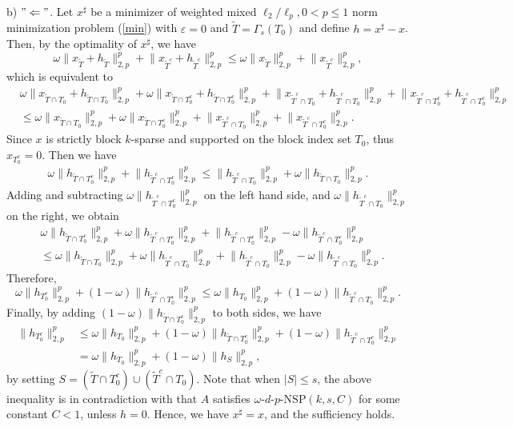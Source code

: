\documentclass[11pt]{article}
\begin{document}
b) $"\Leftarrow"$. Let $x^{\sharp}$ be a minimizer of  weighted mixed $\ell_2/\ell_p, 0<p\leq 1$ norm minimization problem (\ref{min}) with $\varepsilon=0$ and $\tilde{T}=\Gamma_s(T_0)$ and define $h=x^{\sharp}-x$. Then, by the optimality of $x^{\sharp}$, we have $$
\omega\lVert x_{\tilde{T}}+h_{\tilde{T}}\rVert_{2,p}^p+\lVert x_{\tilde{T}^c}+h_{\tilde{T}^c}\rVert_{2,p}^p\leq \omega\lVert x_{\tilde{T}}\rVert_{2,p}^p+
\lVert x_{\tilde{T}^c}\rVert_{2,p}^p,
$$
which is equivalent to \begin{align*}
&\omega\lVert x_{\tilde{T}\cap T_0}+h_{\tilde{T}\cap T_0}\rVert_{2,p}^p+\omega\lVert x_{\tilde{T}\cap T_0^c}+h_{\tilde{T}\cap T_0^c}\rVert_{2,p}^p+\lVert x_{\tilde{T}^c\cap T_0}+h_{\tilde{T}^c\cap T_0}\rVert_{2,p}^p+\lVert x_{\tilde{T}^c\cap T_0^c}+h_{\tilde{T}^c\cap T_0^c}\rVert_{2,p}^p \\
&\leq \omega\lVert x_{\tilde{T}\cap T_0}\rVert_{2,p}^p+ \omega\lVert x_{\tilde{T}\cap T_0^c}\rVert_{2,p}^p+\lVert x_{\tilde{T}^c\cap T_0}\rVert_{2,p}^p+\lVert x_{\tilde{T}^c\cap T_0^c}\rVert_{2,p}^p.
\end{align*}
Since $x$ is strictly block $k$-sparse and supported on the block index set $T_0$, thus $x_{T_0^c}=0$. Then we have \begin{align*}
\omega\lVert h_{\tilde{T}\cap T_0^c}\rVert_{2,p}^p+\lVert h_{\tilde{T}^c\cap T_0^c}\rVert_{2,p}^p\leq \lVert h_{\tilde{T}^c\cap T_0}\rVert_{2,p}^p+\omega\lVert h_{\tilde{T}\cap T_0}\rVert_{2,p}^p.
\end{align*}
Adding and subtracting  $\omega\lVert h_{\tilde{T}^c\cap T_0^c}\rVert_{2,p}^p$ on the left hand side, and $\omega\lVert h_{\tilde{T}^c\cap T_0}\rVert_{2,p}^p$ on the right, we obtain \begin{align*}
&\omega\lVert h_{\tilde{T}\cap T_0^c}\rVert_{2,p}^p+\omega\lVert h_{\tilde{T}^c\cap T_0^c}\rVert_{2,p}^p+\lVert h_{\tilde{T}^c\cap T_0^c}\rVert_{2,p}^p-\omega\lVert h_{\tilde{T}^c\cap T_0^c}\rVert_{2,p}^p \\
&\leq \omega\lVert h_{\tilde{T}\cap T_0}\rVert_{2,p}^p+\omega\lVert h_{\tilde{T}^c\cap T_0}\rVert_{2,p}^p+\lVert h_{\tilde{T}^c\cap T_0}\rVert_{2,p}^p-\omega\lVert h_{\tilde{T}^c\cap T_0}\rVert_{2,p}^p.
\end{align*}
Therefore, $$
\omega\lVert h_{T_0^c}\rVert_{2,p}^p+(1-\omega)\lVert h_{\tilde{T}^c\cap T_0^c}\rVert_{2,p}^p\leq \omega\lVert h_{T_0}\rVert_{2,p}^p+(1-\omega)\lVert h_{\tilde{T}^c\cap T_0}\rVert_{2,p}^p.
$$
Finally, by adding $(1-\omega)\lVert h_{\tilde{T}\cap T_0^c}\rVert_{2,p}^p$ to both sides, we have \begin{align}
\lVert h_{T_0^c}\rVert_{2,p}^p&\leq \omega\lVert h_{T_0}\rVert_{2,p}^p+(1-\omega)\lVert h_{\tilde{T}\cap T_0^c}\rVert_{2,p}^p+(1-\omega)\lVert h_{\tilde{T}^c\cap T_0^c}\rVert_{2,p}^p  \nonumber \\
&=\omega\lVert h_{T_0}\rVert_{2,p}^p+(1-\omega)\lVert h_S\rVert_{2,p}^p,
\end{align}
by setting $S=(\tilde{T}\cap T_0^c)\cup(\tilde{T}^c\cap T_0)$. Note that when $|S|\leq s$, the above inequality is in contradiction with that $A$ satisfies $\omega$-$d$-$p$-$\mathrm{NSP}(k,s,C)$ for some constant $C<1$, unless $h=0$. Hence, we have $x^{\sharp}=x$, and the sufficiency holds.
\end{document}
